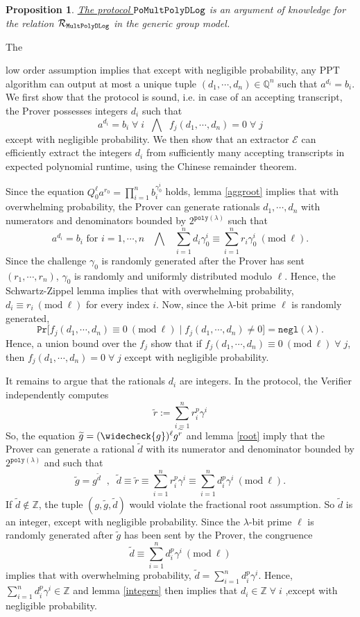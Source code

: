 \documentclass[11pt, lettersize, notitlepage, leqno, footskip=0.6cm]{article}
\newcommand{\bz}{\mathbb Z}
\newcommand{\bq}{\mathbb Q}
\newcommand{\slim}{\sum\limits}
\newcommand{\ttt}{\texttt}
\newcommand{\negl}{\ttt{{negl}}}
\newcommand{\wti}{\widetilde}
\newcommand{\mc}{\mathcal}
\newcommand{\lam}{\lambda}
\newcommand{\weck}{\widecheck}
\newcommand{\vs}{\vspace{-0.15cm}}
\newcommand{\op}{overwhelming probability}
\newcommand{\np}{negligible probability}
\newcommand{\Mod}[1]{\ (\mathrm{mod}\ #1)}
\newcommand{\E}{\mc{E}}
\newtheorem{Prop}[Thm]{Proposition}
\numberwithin{equation}{section}
\begin{document}
\begin{Prop}\hyperlink{Mult} {The protocol $\tt{PoMultPolyDLog}$} is an argument of knowledge for the relation $\mc{R}_{{\tt{MultPolyDLog}}}$ in the generic group model.\end{Prop}

\begin{prf} \hypertarget{Generalized}{The} low order assumption implies that except with \np, any PPT algorithm can output at most a unique tuple $(d_1,\cdots,d_n)\in\bq^n$ such that $a^{d_i} = b_i$. We first show that the protocol is sound, i.e. in case of an accepting transcript, the Prover possesses integers $d_i$ such that $$a^{d_i} = b_i\;\forall\; i\;\;\bigwedge\;\;f_j(d_1,\cdots,d_n) = 0\;\forall\; j $$ except with \np.  We then show that an extractor $\E$ can efficiently extract the integers $d_i$ from sufficiently many accepting transcripts in expected polynomial runtime, using the Chinese remainder theorem.

Since the equation $Q_0^{\ell} a^{r_0} = \prod_{i=1}^n b_i^{\gamma_{0}^i}$ holds, lemma \ref{aggroot} implies that with \op, the Prover can generate rationals $d_1,\cdots,d_n$ with numerators and denominators bounded by $2^{\ttt{poly}(\lam)}$ such that \vs $$a^{d_i} = b_i \text{ for } i=1,\cdots,n \;\;\;\bigwedge\;\;\; \sum\limits_{i=1}^n d_i\gamma_{0}^i\equiv \sum\limits_{i=1}^n r_i\gamma_{0}^i\Mod{\ell}.$$ Since the challenge $\gamma_{0}$ is randomly generated after the Prover has sent $(r_1,\cdots,r_n)$, $\gamma_{0}$ is randomly and uniformly distributed modulo $\ell$. Hence, the Schwartz-Zippel lemma implies that with \op, $d_i\equiv r_i\Mod{\ell}$ for every index $i$. Now, since the $\lam$-bit prime $\ell$ is randomly generated, \vs $$\ttt{Pr}\Big[f_j(d_1,\cdots,d_n)\equiv 0\Mod{\ell} \;\Big|\; f_j(d_1,\cdots,d_n)\neq 0 \Big] = \negl(\lam) .$$ Hence, a union bound over the $f_j$ show that if $f_j(d_1,\cdots,d_n)\equiv 0\Mod{\ell}\;\forall\;j$, then $f_j(d_1,\cdots,d_n) = 0 \;\forall\;j$ except with \np.

It remains to argue that the rationals $d_i$ are integers. In the protocol, the Verifier independently computes $$\wti{r}:= \slim_{i=1}^n r_i^{p}\gamma^i$$ So, the equation $\wti{g} = (\weck{g})^{\ell}g^{\wti{r}} $ and lemma \ref{root} imply that the Prover can generate a rational $\wti{d}$ with its numerator and denominator bounded by $2^{\ttt{poly}(\lam)}$ and such that \vs $$\wti{g} = g^{\wti{d}}\;\;,\;\;\wti{d}\equiv \wti{r}\equiv \slim_{i=1}^n r_i^p\gamma^i\equiv \slim_{i=1}^n d_i^p\gamma^i\Mod{\ell}.$$ If $\wti{d}\notin\bz$, the tuple $(g, \wti{g}, \wti{d})$ would violate the fractional root assumption. So $\wti{d}$ is an integer, except with negligible probability. Since the $\lam$-bit prime $\ell$ is randomly generated after $\wti{g}$ has been sent by the Prover, the congruence \vs $$\wti{d}\equiv \slim_{i=1}^n d_i^p\gamma^i\Mod{\ell} $$ implies that with \op, $\wti{d} = \slim_{i=1}^n d_i^p\gamma^i.$ Hence, $\slim_{i=1}^n d_i^p\gamma^i\in \bz$ and lemma \ref{integers} then implies that $ d_i\in \bz\;\forall\;i$ ,except with negligible probability. 


\end{prf}
\end{document}
